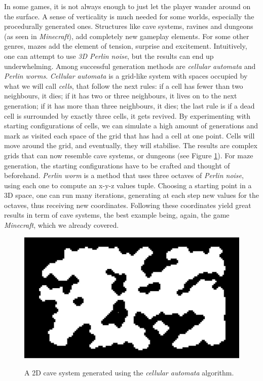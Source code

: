 In some games, it is not always enough to just let the player wander around on the surface. A sense of verticality is much needed for some worlds, especially the procedurally generated ones. Structures like cave systems, ravines and dungeons (as seen in \textit{Minecraft}), add completely new gameplay elements. For some other genres, mazes add the element of tension, surprise and excitement. Intuitively, one can attempt to use \textit{3D Perlin noise}, but the results can end up underwhelming. Among successful generation methods are \textit{cellular automata} and \textit{Perlin worms}. \textit{Cellular automata} is a grid-like system with spaces occupied by what we will call \textit{cells}, that follow the next rules: if a cell has fewer than two neighbours, it dies; if it has two or three neighbours, it lives on to the next generation; if it has more than three neighbours, it dies; the last rule is if a dead cell is surrounded by exactly three cells, it gets revived. By experimenting with starting configurations of cells, we can simulate a high amount of generations and mark as visited each space of the grid that has had a cell at one point. Cells will move around the grid, and eventually, they will stabilise. The results are complex grids that can now resemble cave systems, or dungeons (see Figure \ref{fig:cellularAutomata}). For maze generation, the starting configurations have to be crafted and thought of beforehand. \textit{Perlin worm} is a method that uses three octaves of \textit{Perlin noise}, using each one to compute an x-y-z values tuple. Choosing a starting point in a 3D space, one can run many iterations, generating at each step new values for the octaves, thus receiving new coordinates. Following these coordinates yield great results in term of cave systems, the best example being, again, the game \textit{Minecraft}, which we already covered. 

\begin{figure}[htp]
    \centering
    \includegraphics[width = 16cm]{figures/cellularAutomata.png}
    \caption{A 2D cave system generated using the \textit{cellular automata} algorithm.}
    \cite{procCaveGen}
    \label{fig:cellularAutomata}
\end{figure}


